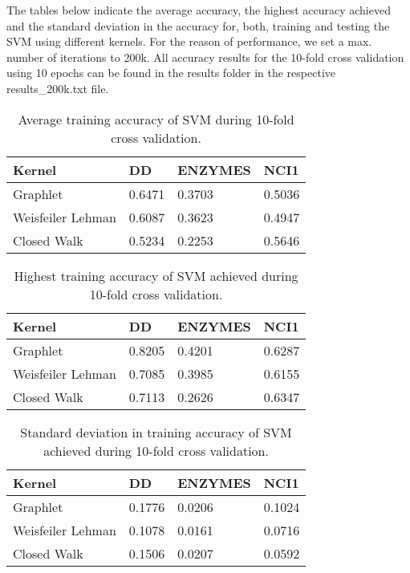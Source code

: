 \documentclass[12pt,a4paper,leqno]{article}
\begin{document}
The tables below indicate the average accuracy, the highest accuracy achieved and the standard deviation in the accuracy for, both, training and testing the SVM using different kernels. For the reason of performance, we set a max. number of iterations to 200k. All accuracy results for the 10-fold cross validation using 10 epochs can be found in the results folder in the respective results\_200k.txt file.
	
	\begin{table}[h]
		\caption{Average training accuracy of SVM during 10-fold cross validation.}
		\centering
		\begin{tabular}{|l|l|l|l|}
			\hline
			Kernel & DD & ENZYMES  & NCI1  \\
			\hline
			\hline
			Graphlet & 0.6471 &   0.3703&   0.5036\\
			\hline
			Weisfeiler Lehman&  0.6087&  0.3623&  0.4947\\
			\hline
			Closed Walk & 0.5234 & 0.2253&  0.5646 \\
			\hline
		\end{tabular}
	\end{table}

	\begin{table}[h]
		\caption{Highest training accuracy of SVM achieved during 10-fold cross validation.}
		\centering
		\begin{tabular}{|l|l|l|l|}
			\hline
			Kernel & DD & ENZYMES  & NCI1  \\
			\hline
			\hline
			Graphlet &  0.8205&   0.4201&  0.6287 \\
			\hline
			Weisfeiler Lehman&  0.7085&  0.3985& 0.6155 \\
			\hline
			Closed Walk &  0.7113&  0.2626 &   0.6347 \\
			\hline
		\end{tabular}
	\end{table}

		\begin{table}[h]
		\caption{Standard deviation in training accuracy of SVM achieved during 10-fold cross validation.}
		\centering
		\begin{tabular}{|l|l|l|l|}
			\hline
			Kernel & DD & ENZYMES  & NCI1  \\
			\hline
			\hline
			Graphlet &  0.1776&   0.0206&  0.1024 \\
			\hline
			Weisfeiler Lehman&  0.1078 &  0.0161& 0.0716 \\
			\hline
			Closed Walk &  0.1506&  0.0207&   0.0592 \\
			\hline
		\end{tabular}
		\end{table}
	
\end{document}
